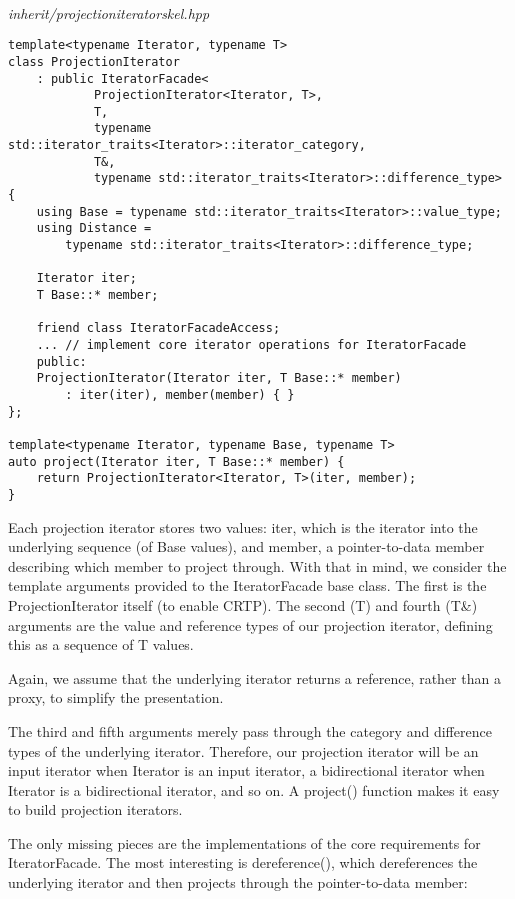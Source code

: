 \hspace*{\fill} \\ %
\noindent
\textit{inherit/projectioniteratorskel.hpp}
\begin{lstlisting}[style=styleCXX]
template<typename Iterator, typename T>
class ProjectionIterator
	: public IteratorFacade<
			ProjectionIterator<Iterator, T>,
			T,
			typename std::iterator_traits<Iterator>::iterator_category,
			T&,
			typename std::iterator_traits<Iterator>::difference_type>
{
	using Base = typename std::iterator_traits<Iterator>::value_type;
	using Distance =
		typename std::iterator_traits<Iterator>::difference_type;
	
	Iterator iter;
	T Base::* member;
	
	friend class IteratorFacadeAccess;
	... // implement core iterator operations for IteratorFacade
	public:
	ProjectionIterator(Iterator iter, T Base::* member)
		: iter(iter), member(member) { }
};

template<typename Iterator, typename Base, typename T>
auto project(Iterator iter, T Base::* member) {
	return ProjectionIterator<Iterator, T>(iter, member);
}
\end{lstlisting}

Each projection iterator stores two values: iter, which is the iterator into the underlying sequence (of Base values), and member, a pointer-to-data member describing which member to project through. With that in mind, we consider the template arguments provided to the IteratorFacade base class. The first is the ProjectionIterator itself (to enable CRTP). The second (T) and fourth (T\&) arguments are the value and reference types of our projection iterator, defining this as a sequence of T values.

\begin{tcolorbox}[colback=webgreen!5!white,colframe=webgreen!75!black]
\hspace*{0.75cm}Again, we assume that the underlying iterator returns a reference, rather than a proxy, to simplify the presentation.
\end{tcolorbox}

The third and fifth arguments merely pass through the category and difference types of the underlying iterator. Therefore, our projection iterator will be an input iterator when Iterator is an input iterator, a bidirectional iterator when Iterator is a bidirectional iterator, and so on. A project() function makes it easy to build projection iterators.

The only missing pieces are the implementations of the core requirements for IteratorFacade. The most interesting is dereference(), which dereferences the underlying iterator and then projects through the pointer-to-data member:

